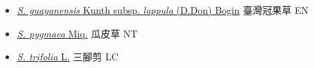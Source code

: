 \begin{itemize}
  \begin{itemize}
        \item[] \href{http://www.theplantlist.org/tpl1.1/search?q=Sagittaria+guayanensis+subsp.+lappula}{\textit{S. guayanensis} Kunth subsp. \textit{lappula} (D.Don) Bogin}   臺灣冠果草 EN
        \item[] \href{http://www.theplantlist.org/tpl1.1/search?q=Sagittaria+pygmaea}{\textit{S. pygmaea} Miq.}   瓜皮草 NT
        \item[] \href{http://www.theplantlist.org/tpl1.1/search?q=Sagittaria+trifolia}{\textit{S. trifolia} L.}   三腳剪 LC
  \end{itemize}
  \end{itemize}

